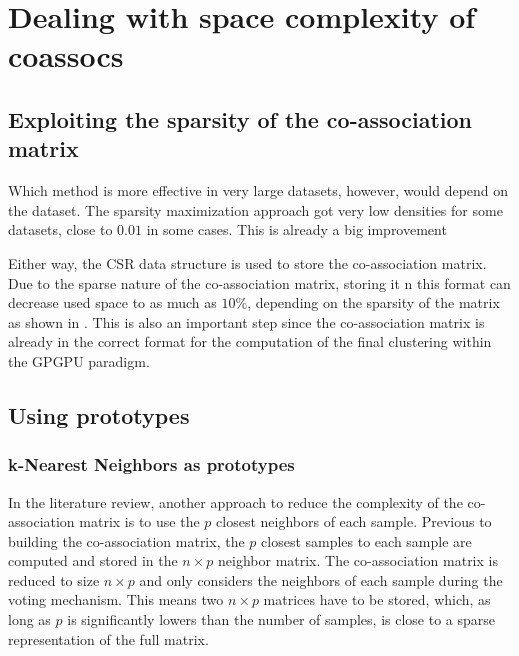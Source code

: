 
\section{Dealing with space complexity of coassocs}

\subsection{Exploiting the sparsity of the co-association matrix}



Which method is more effective in very large datasets, however, would depend on the dataset.
The sparsity maximization approach got very low densities for some datasets, close to $0.01$ in some cases.
This is already a big improvement

Either way, the CSR data structure is used to store the co-association matrix. 
Due to the sparse nature of the co-association matrix, storing it n this format can decrease used space to as much as $10\%$, depending on the sparsity of the matrix as shown in \cite{Lourenco2010}. 
This is also an important step since the co-association matrix is already in the correct format for the computation of the final clustering within the GPGPU paradigm.

\subsection{Using prototypes}

\subsubsection{k-Nearest Neighbors as prototypes}
In the literature review, another approach to reduce the complexity of the co-association matrix is to use the $p$ closest neighbors of each sample.
Previous to building the co-association matrix, the $p$ closest samples to each sample are computed and stored in the $n \times p$ neighbor matrix.
The co-association matrix is reduced to size $n \times p$ and only considers the neighbors of each sample during the voting mechanism.
This means two $n \times p$ matrices have to be stored, which, as long as $p$ is significantly lowers than the number of samples, is close to a sparse representation of the full matrix.

